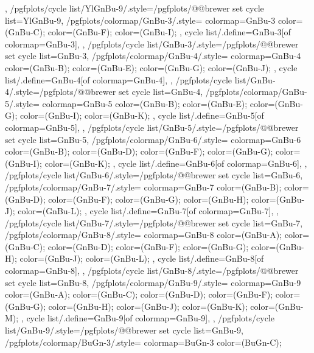 {{  },
  /pgfplots/cycle list/YlGnBu-9/.style={/pgfplots/@@brewer set cycle list={YlGnBu-9}},
  /pgfplots/colormap/GnBu-3/.style={
    colormap={GnBu-3}{
      color=(GnBu-C);
      color=(GnBu-F);
      color=(GnBu-I);
    },
    cycle list/.define={GnBu-3}{[of colormap=GnBu-3]},
  },
  /pgfplots/cycle list/GnBu-3/.style={/pgfplots/@@brewer set cycle list={GnBu-3}},
  /pgfplots/colormap/GnBu-4/.style={
    colormap={GnBu-4}{
      color=(GnBu-B);
      color=(GnBu-E);
      color=(GnBu-G);
      color=(GnBu-J);
    },
    cycle list/.define={GnBu-4}{[of colormap=GnBu-4]},
  },
  /pgfplots/cycle list/GnBu-4/.style={/pgfplots/@@brewer set cycle list={GnBu-4}},
  /pgfplots/colormap/GnBu-5/.style={
    colormap={GnBu-5}{
      color=(GnBu-B);
      color=(GnBu-E);
      color=(GnBu-G);
      color=(GnBu-I);
      color=(GnBu-K);
    },
    cycle list/.define={GnBu-5}{[of colormap=GnBu-5]},
  },
  /pgfplots/cycle list/GnBu-5/.style={/pgfplots/@@brewer set cycle list={GnBu-5}},
  /pgfplots/colormap/GnBu-6/.style={
    colormap={GnBu-6}{
      color=(GnBu-B);
      color=(GnBu-D);
      color=(GnBu-F);
      color=(GnBu-G);
      color=(GnBu-I);
      color=(GnBu-K);
    },
    cycle list/.define={GnBu-6}{[of colormap=GnBu-6]},
  },
  /pgfplots/cycle list/GnBu-6/.style={/pgfplots/@@brewer set cycle list={GnBu-6}},
  /pgfplots/colormap/GnBu-7/.style={
    colormap={GnBu-7}{
      color=(GnBu-B);
      color=(GnBu-D);
      color=(GnBu-F);
      color=(GnBu-G);
      color=(GnBu-H);
      color=(GnBu-J);
      color=(GnBu-L);
    },
    cycle list/.define={GnBu-7}{[of colormap=GnBu-7]},
  },
  /pgfplots/cycle list/GnBu-7/.style={/pgfplots/@@brewer set cycle list={GnBu-7}},
  /pgfplots/colormap/GnBu-8/.style={
    colormap={GnBu-8}{
      color=(GnBu-A);
      color=(GnBu-C);
      color=(GnBu-D);
      color=(GnBu-F);
      color=(GnBu-G);
      color=(GnBu-H);
      color=(GnBu-J);
      color=(GnBu-L);
    },
    cycle list/.define={GnBu-8}{[of colormap=GnBu-8]},
  },
  /pgfplots/cycle list/GnBu-8/.style={/pgfplots/@@brewer set cycle list={GnBu-8}},
  /pgfplots/colormap/GnBu-9/.style={
    colormap={GnBu-9}{
      color=(GnBu-A);
      color=(GnBu-C);
      color=(GnBu-D);
      color=(GnBu-F);
      color=(GnBu-G);
      color=(GnBu-H);
      color=(GnBu-J);
      color=(GnBu-K);
      color=(GnBu-M);
    },
    cycle list/.define={GnBu-9}{[of colormap=GnBu-9]},
  },
  /pgfplots/cycle list/GnBu-9/.style={/pgfplots/@@brewer set cycle list={GnBu-9}},
  /pgfplots/colormap/BuGn-3/.style={
    colormap={BuGn-3}{
      color=(BuGn-C);
}}}
